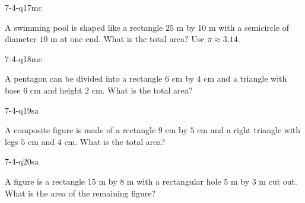 \begin{practiceQuestion}{7-4-q17}{mc}
\begin{questionText}
A swimming pool is shaped like a rectangle $25$ m by $10$ m with a semicircle of diameter $10$ m at one end. What is the total area? Use $\pi \approx 3.14$.
\end{questionText}
\end{practiceQuestion}

\begin{practiceQuestion}{7-4-q18}{mc}
\begin{questionText}
A pentagon can be divided into a rectangle $6$ cm by $4$ cm and a triangle with base $6$ cm and height $2$ cm. What is the total area?
\end{questionText}
\end{practiceQuestion}


\begin{practiceQuestion}{7-4-q19}{sa}
\begin{questionText}
A composite figure is made of a rectangle $9$ cm by $5$ cm and a right triangle with legs $5$ cm and $4$ cm. What is the total area?
\end{questionText}
\end{practiceQuestion}

\begin{practiceQuestion}{7-4-q20}{sa}
\begin{questionText}
A figure is a rectangle $15$ m by $8$ m with a rectangular hole $5$ m by $3$ m cut out. What is the area of the remaining figure?
\end{questionText}
\end{practiceQuestion}

